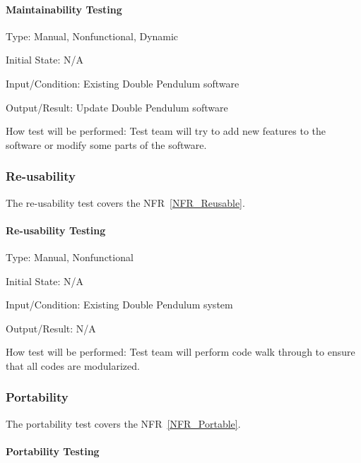 \documentclass[12pt, titlepage]{article}
\begin{document}
\paragraph{Maintainability Testing\\} 

Type: Manual, Nonfunctional, Dynamic
          
Initial State: N/A
          
Input/Condition: Existing Double Pendulum software
          
Output/Result: Update Double Pendulum software
          
How test will be performed: Test team will try to add new features to the software or modify some parts of the software.


\subsubsection{Re-usability}\label{ReuseTest}
The re-usability test covers the NFR~\ref{NFR_Reusable}. 

\paragraph{Re-usability Testing\\}
Type: Manual, Nonfunctional

Initial State: N/A
          
Input/Condition: Existing Double Pendulum system
          
Output/Result: N/A
          
How test will be performed: Test team will perform code walk through to ensure that all codes are modularized. 


\subsubsection{Portability} \label{PortTest}
The portability test covers the NFR~\ref{NFR_Portable}.

\paragraph{Portability Testing\\}
\end{document}
